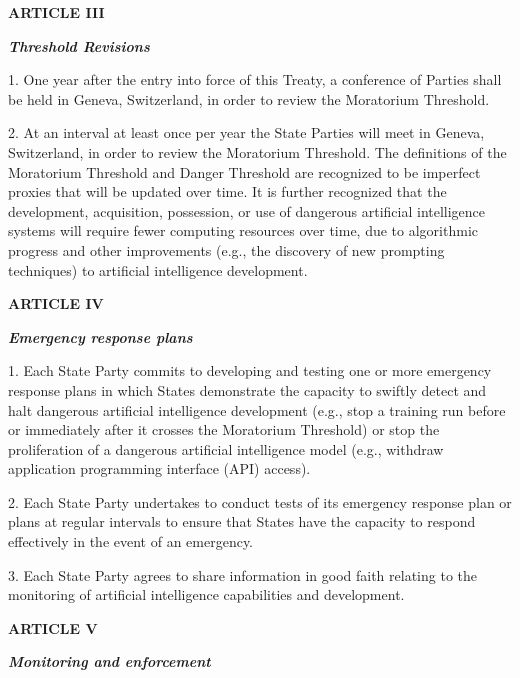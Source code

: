 \documentclass[12pt,a4paper]{article}
\begin{document}
\begin{center}

\textbf{{ARTICLE III}}

\textit{\textbf{Threshold Revisions}}
\end{center}

1. One year after the entry into force of this Treaty, a conference of Parties shall be held in Geneva, Switzerland, in order to review the Moratorium Threshold.

2. At an interval at least once per year the State Parties will meet in Geneva, Switzerland, in order to review the Moratorium Threshold. The definitions of the Moratorium Threshold and Danger Threshold are recognized to be imperfect proxies that will be updated over time. It is further recognized that the development, acquisition, possession, or use of dangerous artificial intelligence systems will require fewer computing resources over time, due to algorithmic progress and other improvements (e.g., the discovery of new prompting techniques) to artificial intelligence development. 

 \begin{center}

\textbf{{ARTICLE IV}}

\textit{\textbf{Emergency response plans}}

\end{center}

1. Each State Party commits to developing and testing one or more emergency response plans in which States demonstrate the capacity to swiftly detect and halt dangerous artificial intelligence development (e.g., stop a training run before or immediately after it crosses the Moratorium Threshold) or stop the proliferation of a dangerous artificial intelligence model (e.g., withdraw application programming interface (API) access). 

2. Each State Party undertakes to conduct tests of its emergency response plan or plans at regular intervals to ensure that States have the capacity to respond effectively in the event of an emergency. 

3. Each State Party agrees to share information in good faith relating to the monitoring of artificial intelligence capabilities and development. 

\begin{center}

\textbf{{ARTICLE V}}

\textbf{\textit{Monitoring and enforcement}}

\end{center}
\end{document}
